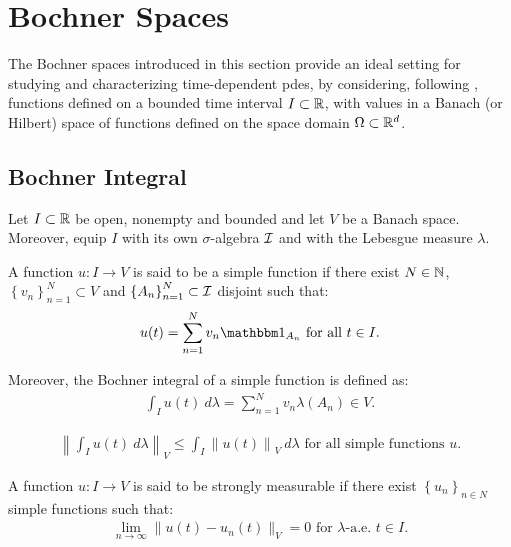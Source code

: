 \section{Bochner Spaces}

The Bochner spaces introduced in this section provide an ideal setting for studying and characterizing time-dependent \acrshort{pdes}, by considering, following \cite[p. 111]{Ern2021}, functions defined on a bounded time interval $I \subset \mathbb{R}$, with values in a Banach (or Hilbert) space of functions defined on the space domain $\Omega \subset \mathbb{R}^{d}$.

\subsection{Bochner Integral}

Let $I \subset \mathbb{R}$ be open, nonempty and bounded and let $V$ be a Banach space. Moreover, equip $I$ with its own $\sigma$-algebra $\mathcal{I}$ and with the Lebesgue measure $\lambda$.

\begin{definition}
    A function $u\colon I \rightarrow V$ is said to be a simple function if there exist $N \in \mathbb{N}$, $\left\{ v_n \right\}_{n = 1}^N \subset V$ and $\left\{ A_n \right\}_{n = 1}^N \subset \mathcal{I}$ disjoint such that:
    \begin{gather}
        u(t) = \sum_{n = 1}^N v_n \Characteristic{A_n} \text{ for all } t \in I.
    \end{gather}

    Moreover, the Bochner integral of a simple function is defined as:
    \begin{gather}
        \int_I u(t) ~ d \lambda  = \sum_{n = 1}^N v_n \lambda(A_n) \in V.
    \end{gather}
\end{definition}

\begin{lemma} %
    \begin{gather}
        \left\lVert \int_I u(t) ~ d \lambda \right\rVert_V \leq \int_I \left\lVert u(t) \right\rVert_V ~ d \lambda \text{ for all simple functions } u.
    \end{gather}
\end{lemma}

\begin{definition}
    A function $u\colon I \rightarrow V$ is said to be strongly measurable if there exist $\left\{ u_n \right\}_{n \in N}$ simple functions such that:
    \begin{gather}
        \lim_{n \rightarrow \infty} \lVert u(t) - u_n(t) \rVert_V = 0 \text{ for } \lambda \text{-a.e. } t \in I.
    \end{gather}
\end{definition}

